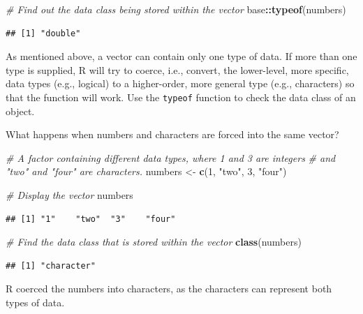 \documentclass[
]{book}
\newenvironment{Shaded}{\begin{snugshade}}{\end{snugshade}}
\newcommand{\CommentTok}[1]{\textcolor[rgb]{0.56,0.35,0.01}{\textit{#1}}}
\newcommand{\DecValTok}[1]{\textcolor[rgb]{0.00,0.00,0.81}{#1}}
\newcommand{\FunctionTok}[1]{\textcolor[rgb]{0.13,0.29,0.53}{\textbf{#1}}}
\newcommand{\NormalTok}[1]{#1}
\newcommand{\OtherTok}[1]{\textcolor[rgb]{0.56,0.35,0.01}{#1}}
\newcommand{\SpecialCharTok}[1]{\textcolor[rgb]{0.81,0.36,0.00}{\textbf{#1}}}
\newcommand{\StringTok}[1]{\textcolor[rgb]{0.31,0.60,0.02}{#1}}
\begin{document}
\begin{Shaded}
\begin{Highlighting}[]
\CommentTok{\# Find out the data class being stored within the vector}
\NormalTok{base}\SpecialCharTok{::}\FunctionTok{typeof}\NormalTok{(numbers)}
\end{Highlighting}
\end{Shaded}

\begin{verbatim}
## [1] "double"
\end{verbatim}

As mentioned above, a vector can contain only one type of data. If more than one type is supplied, R will try to coerce, i.e., convert, the lower-level, more specific, data types (e.g., logical) to a higher-order, more general type (e.g., characters) so that the function will work. Use the \texttt{typeof} function to check the data class of an object.

What happens when numbers and characters are forced into the same vector?

\begin{Shaded}
\begin{Highlighting}[]
\CommentTok{\# A factor containing different data types, where 1 and 3 are integers}
\CommentTok{\# and "two" and "four" are characters.}
\NormalTok{numbers }\OtherTok{\textless{}{-}} \FunctionTok{c}\NormalTok{(}\DecValTok{1}\NormalTok{, }\StringTok{"two"}\NormalTok{, }\DecValTok{3}\NormalTok{, }\StringTok{"four"}\NormalTok{)}

\CommentTok{\# Display the vector}
\NormalTok{numbers}
\end{Highlighting}
\end{Shaded}

\begin{verbatim}
## [1] "1"    "two"  "3"    "four"
\end{verbatim}

\begin{Shaded}
\begin{Highlighting}[]
\CommentTok{\# Find the data class that is stored within the vector}
\FunctionTok{class}\NormalTok{(numbers)}
\end{Highlighting}
\end{Shaded}

\begin{verbatim}
## [1] "character"
\end{verbatim}

R coerced the numbers into characters, as the characters can represent both types of data.
\end{document}
